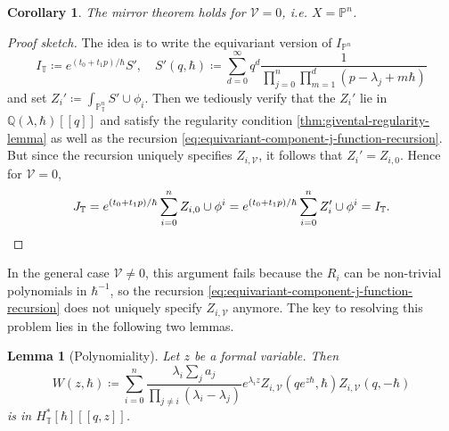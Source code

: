 \documentclass{report}
\theoremstyle{plain}
\newtheorem{lemma}[theorem]{Lemma}
\newtheorem{corollary}[theorem]{Corollary}
\theoremstyle{definition}
\theoremstyle{remark}
\newcommand{\bT}{\mathbb{T}}
\newcommand{\bQ}{\mathbb{Q}}
\newcommand{\bP}{\mathbb{P}}
\newcommand{\cV}{\mathcal{V}}
\begin{document}
\begin{corollary} \label{thm:givental-mirror-theorem-projective-space}
  The mirror theorem holds for $\cV = 0$, i.e. $X = \bP^n$.
\end{corollary}

\begin{proof}[Proof sketch]
  The idea is to write the equivariant version of $I_{\bP^n}$
  \[ I_{\bT} \coloneqq e^{(t_0 + t_1p)/\hbar} S', \quad S'(q, \hbar) \coloneqq \sum_{d=0}^\infty q^d \frac{1}{\prod_{j=0}^n \prod_{m=1}^d (p - \lambda_j + m\hbar)} \]
  and set $Z_i' \coloneqq \int_{\bP^n_{\bT}} S' \cup \phi_i$. Then we
  tediously verify that the $Z_i'$ lie in $\bQ(\lambda, \hbar)[[q]]$
  and satisfy the regularity condition
  \ref{thm:givental-regularity-lemma} as well as the recursion
  \eqref{eq:equivariant-component-j-function-recursion}. But since the
  recursion uniquely specifies $Z_{i,\cV}$, it follows that $Z_i' =
  Z_{i,0}$. Hence for $\cV = 0$,
  \[ J_{\bT} = e^{(t_0 + t_1p)/\hbar} \sum_{i=0}^n Z_{i,0} \cup \phi^i = e^{(t_0 + t_1p)/\hbar} \sum_{i=0}^n Z_i' \cup \phi^i = I_{\bT}. \qedhere \]
\end{proof}

In the general case $\cV \neq 0$, this argument fails because the
$R_i$ can be non-trivial polynomials in $\hbar^{-1}$, so the recursion
\eqref{eq:equivariant-component-j-function-recursion} does not
uniquely specify $Z_{i,\cV}$ anymore. The key to resolving this
problem lies in the following two lemmas.

\begin{lemma}[Polynomiality] \cite[Lemma 11.2.12]{Cox1999} \label{thm:givental-polynomiality-lemma}
  Let $z$ be a formal variable. Then
  \[ W(z, \hbar) \coloneqq \sum_{i=0}^n \frac{\lambda_i \sum_j a_j}{\prod_{j \neq i} (\lambda_i - \lambda_j)} e^{\lambda_i z} Z_{i,\cV}(qe^{z\hbar},\hbar)Z_{i,\cV}(q,-\hbar) \]
  is in $H^*_{\bT}[\hbar][[q,z]]$.
\end{lemma}
\end{document}
